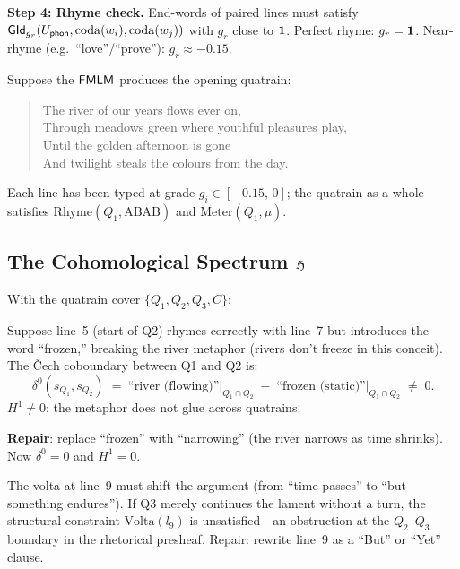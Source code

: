 \textbf{Step 4: Rhyme check.}\quad
End-words of paired lines must satisfy
$\mathsf{GId}_{g_r}(U_{\mathsf{phon}},\mathrm{coda}(w_i),\mathrm{coda}(w_j))$
with $g_r$ close to $\mathbf{1}$.  Perfect rhyme: $g_r=\mathbf{1}$.
Near-rhyme (e.g.\ ``love''/``prove''): $g_r\approx -0.15$.

\medskip
Suppose the $\mathsf{FMLM}$ produces the opening quatrain:
\begin{verse}
  The river of our years flows ever on,\\
  Through meadows green where youthful pleasures play,\\
  Until the golden afternoon is gone\\
  And twilight steals the colours from the day.
\end{verse}
Each line has been typed at grade $g_i\in[-0.15,\,0]$; the quatrain
as a whole satisfies $\mathrm{Rhyme}(Q_1,\text{ABAB})$ and
$\mathrm{Meter}(Q_1,\mu)$.

\subsection{The Cohomological Spectrum $\mathfrak{H}$}

With the quatrain cover $\{Q_1,Q_2,Q_3,C\}$:

\begin{example}
Suppose line~5 (start of Q2) rhymes correctly with line~7 but
introduces the word ``frozen,'' breaking the river metaphor
(rivers don't freeze in this conceit).  The \v{C}ech coboundary
between Q1 and Q2 is:
\[
  \delta^0(s_{Q_1},s_{Q_2})
  \;=\;
  \text{``river (flowing)''}\big|_{Q_1\cap Q_2}
  \;-\;
  \text{``frozen (static)''}\big|_{Q_1\cap Q_2}
  \;\neq\;0.
\]
$H^1\neq 0$: the metaphor does not glue across quatrains.

\textbf{Repair}: replace ``frozen'' with ``narrowing'' (the
river narrows as time shrinks).  Now $\delta^0=0$ and
$H^1=0$.
\end{example}

\begin{example}
The volta at line~9 must shift the argument (from ``time
passes'' to ``but something endures'').  If Q3 merely
continues the lament without a turn, the structural
constraint $\mathrm{Volta}(l_9)$ is unsatisfied---an
obstruction at the $Q_2$--$Q_3$ boundary in the rhetorical
presheaf.  Repair: rewrite line~9 as a ``But'' or ``Yet''
clause.
\end{example}

